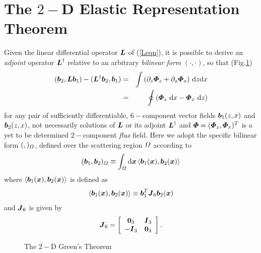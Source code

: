\section{The $2-$D Elastic Representation Theorem} \label{section2Drep}
Given the linear differential operator ${\bmi L}$ of (\ref{Leqn}), it is possible to
derive an {\em adjoint} operator ${\bmi L}^{\dagger}$ relative to an 
arbitrary {\em bilinear form} $(\cdot,\cdot)$, so that (Fig.\ref{G2DThm}) 
\begin{eqnarray} \label{rep1} 
({\bmi b}_{2},{\bmi L}{\bmi b}_{1})-({\bmi L}^{\dagger}{\bmi b}_{2},{\bmi b}_{1})&=& 
\int \left( \partial_{z}{\bmi
\Phi}_{z}+\partial_{x}{\bmi \Phi}_{x}\right)  \,  { \rm d}z { \rm d}x\nonumber\\
&=&\oint \left( {\bmi \Phi}_{z} \ { \rm d}x - {\bmi \Phi}_{x}\  { \rm d}z \right)
\end{eqnarray} 
for any pair of sufficiently differentiable, $6-$component vector
fields ${\bmi b}_{1}(z,x)$ and ${\bmi b}_{2}(z,x)$, not necessarily solutions of
${\bmi L}$ or its adjoint ${\bmi L}^{\dagger}$ and ${\bmi \Phi}=({\bmi 
\Phi}_z,{\bmi \Phi}_x)^T$ 
is a yet to be determined $2-$component {\em flux\/} field. Here we adopt the specific bilinear
form
$(,)_{{\mit \Omega}}$, defined over the scattering region
${\mit \Omega}$ according to
\begin{equation} \label{bilin} 
({\bmi b}_{1},{\bmi b}_{2})_{{\mit \Omega}}\equiv
\int_{{\mit \Omega}} {\rm d}{\bmi x}  \left\langle{\bmi b}_{1}({\bmi x}), {\bmi 
b}_{2}({\bmi x})\right\rangle  
\end{equation}
where $\left\langle{\bmi b}_{1}({\bmi x}), {\bmi b}_{2}({\bmi x})\right\rangle$
is defined as 
\begin{equation}	\label{sharpdef}
\left\langle{\bmi b}_{1}({\bmi x}), {\bmi b}_{2}({\bmi x})\right\rangle\equiv
{\bmi b}_{1}^{T}{\bmi J}_{6}{\bmi b}_{2}({\bmi x})
\end{equation}
and ${\bmi J}_{6}$ is given by
\begin{equation}	\label{Jdef}
{\bmi J}_{6}=\left[{\begin{array}{cc}
{\bf 0}_{3}&{\bmi I}_{3}\\
-{\bmi I}_{3}&{\bf 0}_{3}\end{array}}\right].
\end{equation}

\begin{figure}
\HideDisplacementBoxes
\centerline{}
\caption{The $2-$D Green's Theorem}
\protect\label{G2DThm}
\end{figure}

